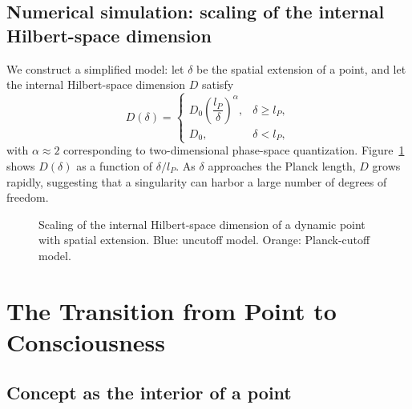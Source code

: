 \documentclass[11pt,a4paper]{article}
\theoremstyle{definition}
\begin{document}
\subsection{Numerical simulation: scaling of the internal Hilbert-space dimension}

We construct a simplified model: let $\delta$ be the spatial extension of a point, and let the internal Hilbert-space dimension $D$ satisfy
\begin{equation}
D(\delta) =
\begin{cases}
D_0 \left(\dfrac{l_P}{\delta}\right)^{\alpha}, & \delta \ge l_P,\\[6pt]
D_0, & \delta < l_P,
\end{cases}
\end{equation}
with $\alpha \approx 2$ corresponding to two-dimensional phase-space quantization. Figure~\ref{fig:dim_scaling} shows $D(\delta)$ as a function of $\delta/l_P$. As $\delta$ approaches the Planck length, $D$ grows rapidly, suggesting that a singularity can harbor a large number of degrees of freedom.

\begin{figure}[htbp]
\centering
{}
\caption{Scaling of the internal Hilbert-space dimension of a dynamic point with spatial extension. Blue: uncutoff model. Orange: Planck-cutoff model.}
\label{fig:dim_scaling}
\end{figure}

\section{The Transition from Point to Consciousness}

\subsection{Concept as the interior of a point}
\end{document}

